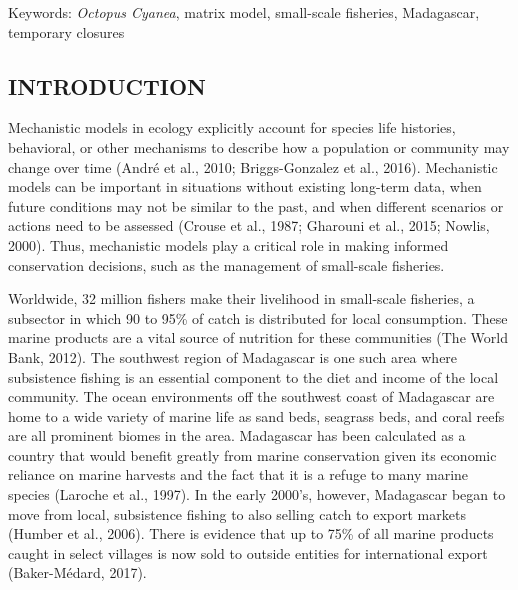 \documentclass[
]{article}
\begin{document}
Keywords: \emph{Octopus Cyanea}, matrix model, small-scale fisheries, Madagascar, temporary closures

\hypertarget{introduction-1}{%
\subsection{INTRODUCTION}\label{introduction-1}}

Mechanistic models in ecology explicitly account for species life histories, behavioral, or other mechanisms to describe how a population or community may change over time (André et al., 2010; Briggs-Gonzalez et al., 2016). Mechanistic models can be important in situations without existing long-term data, when future conditions may not be similar to the past, and when different scenarios or actions need to be assessed (Crouse et al., 1987; Gharouni et al., 2015; Nowlis, 2000). Thus, mechanistic models play a critical role in making informed conservation decisions, such as the management of small-scale fisheries.

Worldwide, 32 million fishers make their livelihood in small-scale fisheries, a subsector in which 90 to 95\% of catch is distributed for local consumption. These marine products are a vital source of nutrition for these communities (The World Bank, 2012). The southwest region of Madagascar is one such area where subsistence fishing is an essential component to the diet and income of the local community. The ocean environments off the southwest coast of Madagascar are home to a wide variety of marine life as sand beds, seagrass beds, and coral reefs are all prominent biomes in the area. Madagascar has been calculated as a country that would benefit greatly from marine conservation given its economic reliance on marine harvests and the fact that it is a refuge to many marine species (Laroche et al., 1997). In the early 2000's, however, Madagascar began to move from local, subsistence fishing to also selling catch to export markets (Humber et al., 2006). There is evidence that up to 75\% of all marine products caught in select villages is now sold to outside entities for international export (Baker-Médard, 2017).
\end{document}
